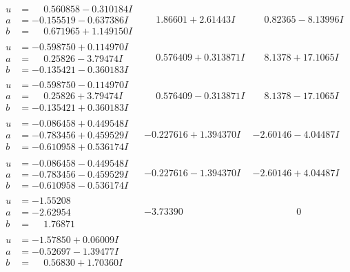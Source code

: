 \documentclass[1p]{elsarticle_modified}
\theoremstyle{definition}
\begin{document}
$$\begin{array}{c|c|c}
\begin{aligned}
u &= \phantom{-}0.560858 - 0.310184 I \\
a &= -0.155519 - 0.637386 I \\
b &= \phantom{-}0.671965 + 1.149150 I\end{aligned}
 & \phantom{-}1.86601 + 2.61443 I & \phantom{-}0.82365 - 8.13996 I \\ \hline\begin{aligned}
u &= -0.598750 + 0.114970 I \\
a &= \phantom{-}0.25826 - 3.79474 I \\
b &= -0.135421 - 0.360183 I\end{aligned}
 & \phantom{-}0.576409 + 0.313871 I & \phantom{-}8.1378 + 17.1065 I \\ \hline\begin{aligned}
u &= -0.598750 - 0.114970 I \\
a &= \phantom{-}0.25826 + 3.79474 I \\
b &= -0.135421 + 0.360183 I\end{aligned}
 & \phantom{-}0.576409 - 0.313871 I & \phantom{-}8.1378 - 17.1065 I \\ \hline\begin{aligned}
u &= -0.086458 + 0.449548 I \\
a &= -0.783456 + 0.459529 I \\
b &= -0.610958 + 0.536174 I\end{aligned}
 & -0.227616 + 1.394370 I & -2.60146 - 4.04487 I \\ \hline\begin{aligned}
u &= -0.086458 - 0.449548 I \\
a &= -0.783456 - 0.459529 I \\
b &= -0.610958 - 0.536174 I\end{aligned}
 & -0.227616 - 1.394370 I & -2.60146 + 4.04487 I \\ \hline\begin{aligned}
u &= -1.55208\phantom{ +0.000000I} \\
a &= -2.62954\phantom{ +0.000000I} \\
b &= \phantom{-}1.76871\phantom{ +0.000000I}\end{aligned}
 & -3.73390\phantom{ +0.000000I} & \phantom{-0.000000 } 0 \\ \hline\begin{aligned}
u &= -1.57850 + 0.06009 I \\
a &= -0.52697 - 1.39477 I \\
b &= \phantom{-}0.56830 + 1.70360 I\end{aligned}

\end{array}$$
\end{document}
